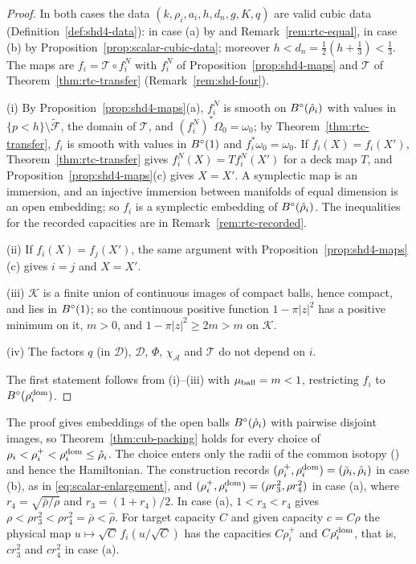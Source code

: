 \begin{proof}
In both cases the data $(k,\rho_i,a_i,h,d_n,g,K,q)$ are valid cubic data (Definition~\ref{def:shd4-data}): in case (a) by
 and Remark~\ref{rem:rtc-equal}, in case (b) by Proposition~\ref{prop:scalar-cubic-data};
moreover $h<d_n=\frac12(h+\frac13)<\frac13$. The maps are $f_i=\mathcal T\circ f^N_i$ with $f^N_i$ of Proposition~\ref{prop:shd4-maps}
and $\mathcal T$ of Theorem~\ref{thm:rtc-transfer} (Remark~\ref{rem:shd-four}).

(i) By Proposition~\ref{prop:shd4-maps}(a), $f^N_i$ is smooth on $B^{\circ}(\hat\rho_i)$ with values in $\{p<h\}\setminus\widetilde{\mathcal F}$, the
domain of $\mathcal T$, and $(f^N_i)^*\Omega_0=\omega_0$; by Theorem~\ref{thm:rtc-transfer}, $f_i$ is smooth with values in $B^{\circ}(1)$
and $f_i^*\omega_0=\omega_0$. If $f_i(X)=f_i(X')$, Theorem~\ref{thm:rtc-transfer} gives $f^N_i(X)=Tf^N_i(X')$ for a deck map $T$, and
Proposition~\ref{prop:shd4-maps}(c) gives $X=X'$. A symplectic map is an immersion, and an injective immersion between
manifolds of equal dimension is an open embedding; so $f_i$ is a symplectic embedding of $B^{\circ}(\hat\rho_i)$. The inequalities
for the recorded capacities are in Remark~\ref{rem:rtc-recorded}.

(ii) If $f_i(X)=f_j(X')$, the same argument with Proposition~\ref{prop:shd4-maps}(c) gives $i=j$ and $X=X'$.

(iii) $\mathcal K$ is a finite union of continuous images of compact balls, hence compact, and lies in $B^{\circ}(1)$; so the continuous
positive function $1-\pi|z|^2$ has a positive minimum on it, $m>0$, and $1-\pi|z|^2\ge2m>m$ on $\mathcal K$.

(iv) The factors $q$ (in $\mathcal D$), $\mathcal D$, $\Phi$, $\chi_{\mathcal A}$ and $\mathcal T$ do not depend on $i$.

The first statement follows from (i)--(iii) with $\mu_{\rm ball}=m<1$, restricting $f_i$ to $B^{\circ}(\rho_i^{\rm dom})$.
\end{proof}

\begin{remark}\label{rem:rtc-recorded}
The proof gives embeddings of the open balls $B^{\circ}(\hat\rho_i)$ with pairwise disjoint images, so Theorem~\ref{thm:cub-packing}
holds for every choice of $\rho_i<\rho_i^+<\rho_i^{\rm dom}\le\hat\rho_i$. The choice enters only the radii of the common
isotopy () and hence the Hamiltonian. The construction records
$(\rho_i^+,\rho_i^{\rm dom})=(\bar\rho_i,\hat\rho_i)$ in case (b), as in \eqref{eq:scalar-enlargement}, and
$(\rho_i^+,\rho_i^{\rm dom})=(\rho r_3^2,\rho r_4^2)$ in case (a), where $r_4=\sqrt{\bar\rho/\rho}$ and $r_3=(1+r_4)/2$. In case (a),
$1<r_3<r_4$ gives $\rho<\rho r_3^2<\rho r_4^2=\bar\rho<\hat\rho$. For target capacity $C$ and given capacity $c=C\rho$
the physical map $u\mapsto\sqrt C\,f_i(u/\sqrt C)$ has the capacities $C\rho_i^+$ and $C\rho_i^{\rm dom}$, that is, $cr_3^2$
and $cr_4^2$ in case (a).
\end{remark}

